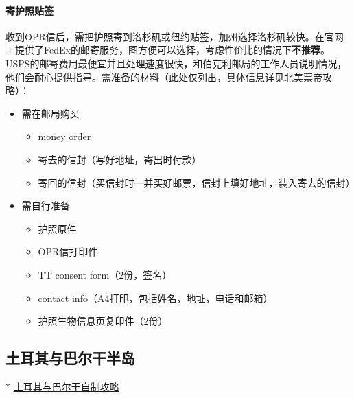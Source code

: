 \paragraph*{寄护照贴签} 收到OPR信后，需把护照寄到洛杉矶或纽约贴签，加州选择洛杉矶较快。在官网上提供了FedEx的邮寄服务，图方便可以选择，考虑性价比的情况下\textbf{不推荐}。USPS的邮寄费用最便宜并且处理速度很快，和伯克利邮局的工作人员说明情况，他们会耐心提供指导。需准备的材料（此处仅列出，具体信息详见北美票帝攻略）：
\begin{itemize}
    \item 需在邮局购买\begin{itemize}
        \item money order
        \item 寄去的信封（写好地址，寄出时付款）
        \item 寄回的信封（买信封时一并买好邮票，信封上填好地址，装入寄去的信封）
    \end{itemize}
    \item 需自行准备\begin{itemize}
        \item 护照原件
        \item OPR信打印件
        \item TT consent form（2份，签名）
        \item contact info（A4打印，包括姓名，地址，电话和邮箱）
        \item 护照生物信息页复印件（2份）
    \end{itemize}
\end{itemize}

\subsection{土耳其与巴尔干半岛}
$\ast$ \href{https://docs.qq.com/sheet/DSGVQamFlUG9IdWlx}{土耳其与巴尔干自制攻略} \\